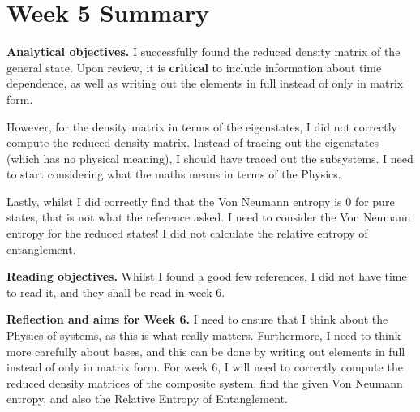 \documentclass{article}
\begin{document}
\section*{Week 5 Summary}

\vspace{0.5cm}

\textbf{Analytical objectives.} I successfully found the reduced density matrix of the general state. Upon review, it is \textbf{critical} to include information about time dependence, as well as writing out the elements in full instead of only in matrix form. 

However, for the density matrix in terms of the eigenstates, I did not correctly compute the reduced density matrix. Instead of tracing out the eigenstates (which has no physical meaning), I should have traced out the subsystems. I need to start considering what the maths means in terms of the Physics. 

Lastly, whilst I did correctly find that the Von Neumann entropy is 0 for pure states, that is not what the reference asked. I need to consider the Von Neumann entropy for the reduced states! I did not calculate the relative entropy of entanglement.

\vspace{0.5cm}

\textbf{Reading objectives.} Whilst I found a good few references, I did not have time to read it, and they shall be read in week 6. 

\vspace{0.5cm}

\textbf{Reflection and aims for Week 6.} I need to ensure that I think about the Physics of systems, as this is what really matters. Furthermore, I need to think more carefully about bases, and this can be done by writing out elements in full instead of only in matrix form. 
For week 6, I will need to correctly compute the reduced density matrices of the composite system, find the given Von Neumann entropy, and also the Relative Entropy of Entanglement. 
\end{document}
